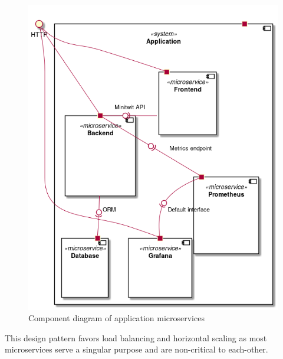 \begin{figure}[h]
    \centering
    \includegraphics[scale=.5]{images/microservices-components.png}
    \caption{Component diagram of application microservices}
    \label{fig:microservices}
\end{figure}

This design pattern favors load balancing and horizontal scaling as most microservices serve a singular purpose and are non-critical to each-other.


